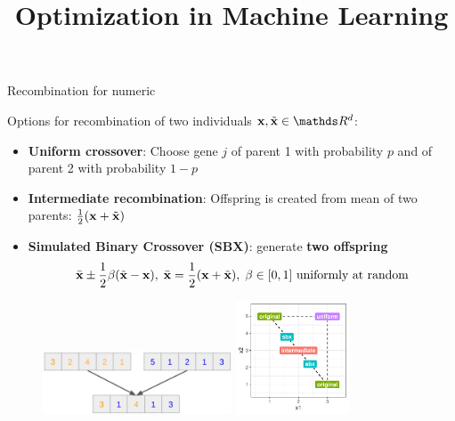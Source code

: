 \documentclass[11pt,compress,t,notes=noshow, xcolor=table]{beamer}
\title{Optimization in Machine Learning}
\date{}
\begin{document}
\sloppy

\begin{vbframe}{Recombination for numeric}

Options for recombination of two individuals $\xv, \tilde{\xv} \in \R^d$: 
\begin{itemize}
    \item \textbf{Uniform crossover}: Choose gene $j$ of parent 1 with probability $p$ and of parent 2 with probability $1-p$
    \item \textbf{Intermediate recombination}: Offspring is created from mean of two parents: $\frac{1}{2}(\mathbf{x} + \tilde{\mathbf{x}})$
    \item \textbf{Simulated Binary Crossover (SBX)}: generate \textbf{two offspring}
        $$
            \bar{\mathbf{x}} \pm \frac{1}{2} \beta (\tilde{\mathbf{x}} - \mathbf{x}), \; \bar{\mathbf{x}} = \frac{1}{2} (\mathbf{x} + \tilde{\mathbf{x}}), \; \text{$\beta \in [0,1]$ uniformly at random}
        $$
\end{itemize}

\vspace*{-0.3cm}
\begin{figure}
  \vspace*{-0.3cm}
  \includegraphics[width=0.5\textwidth]{figure_man/ea_recombination_uniform.png}  
  \includegraphics[width=0.3\textwidth]{figure_man/ea_recombination_numeric.pdf}
\end{figure}

\end{vbframe}
\end{document}
